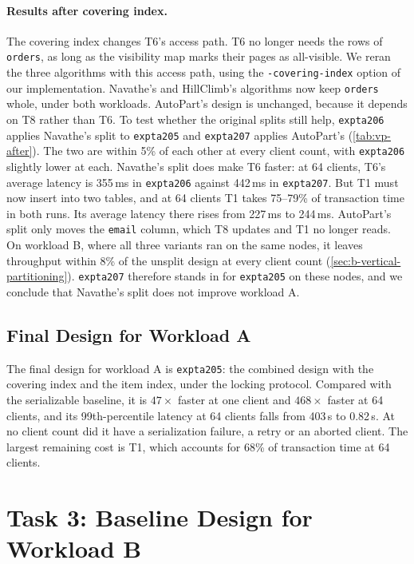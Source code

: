 \documentclass[sigconf,10pt,nonacm]{acmart}
\newcommand{\expt}[1]{\texttt{expt\textunderscore #1}}
\renewcommand{\_}{\underscorewithoutbreak\allowbreak}
\begin{document}
\paragraph{Results after covering index.} The covering index changes T6's access path.
T6 no longer needs the rows of \texttt{orders}, as long as the visibility map marks
their pages as all-visible. We reran the three algorithms with this access path, using
the \texttt{-covering-index} option of our implementation. Navathe's and HillClimb's
algorithms now keep \texttt{orders} whole, under both workloads. AutoPart's design is
unchanged, because it depends on T8 rather than T6. To test whether the original
splits still help, \expt{a206} applies Navathe's split to \expt{a205} and \expt{a207}
applies AutoPart's (\cref{tab:vp-after}). The two are within 5\% of each other at every
client count, with \expt{a206} slightly lower at each. Navathe's split does make T6
faster: at 64 clients, T6's average latency is 355\,ms in \expt{a206} against 442\,ms
in \expt{a207}. But T1 must now insert into two tables, and at 64 clients T1 takes
75--79\% of transaction time in both runs. Its average latency there rises from
227\,ms to 244\,ms. AutoPart's split only moves the \texttt{email} column, which T8
updates and T1 no longer reads. On workload B, where all three variants ran on the same
nodes, it leaves throughput within 8\% of the unsplit design at every client count
(\cref{sec:b-vertical-partitioning}). \expt{a207} therefore stands in for \expt{a205}
on these nodes, and we conclude that Navathe's split does not improve workload A.

\subsection{Final Design for Workload A}
\label{sec:final-a}

The final design for workload A is \expt{a205}: the combined design with the covering
index and the item index, under the locking protocol. Compared with the serializable
baseline, it is $47\times$ faster at one client and $468\times$ faster at 64 clients,
and its 99th-percentile latency at 64 clients falls from 403\,s to 0.82\,s. At no
client count did it have a serialization failure, a retry or an aborted client. The
largest remaining cost is T1, which accounts for 68\% of transaction time at 64
clients.

\section{Task 3: Baseline Design for Workload B}
\label{sec:task3}
\end{document}
